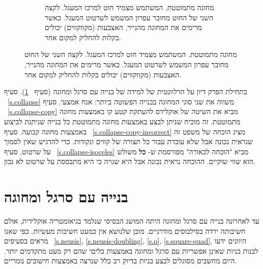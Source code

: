 \begin{figure}[htb]
\begin{center}
\begin{subfigure}[b]{.4\textwidth}
\caption{%
מחוגה מתמוטטת. המשתמש מצמיד חוט למרכז המעגל. לקצה השני של החוט מחובר עפרון המשמש לשרטוט המעגל. כאשר מרימים את המחוגה מהנייר, האצבעות (מקווקווים) יכולים בקלות להחליק למקום אחר.%
}\label{fig.collapsing-compass}
\end{subfigure}
\end{center}
\end{figure}

בתחילת הפרק דיון על הרלוונטית של למידה של בנייה עם סרגל ומחוגה (סעיף%
~\ref{s.relevance}).
סעיף%
~\ref{s.collapse} 
משווה את שני סוגי המחוגה בבנייה הפשוטה ביותר: אנח אמצעי. סעיף%
~\ref{s.collapse-copy}
מביא את השיטה של אוקלידס להעתקת קטע קו באמצעות מחוגה מתמוטטת. זה מוכיח שניתן לבצע באמצעות מחוגה מתמוטטת כל בנייה שניתנת לביצוע באמצעות מחוגה קבועה. סעיף%
~\ref{s.collapse-copy-incorrect} 
מציג הוכחה של משפט זה שנראית נכונה אבל שלא עובדת עבור כל תצורה של קווים ונקודות. כדי להדגיש שאין לסמוך על שרטוט, סעיף%
~\ref{s.collapse-isoceles}
מביא "הוכחה לכאורה" מפורסמת ש-
\textbf{כל}
משולש הוא שווי שוקיים. ההוכחה נראית נכונה אבל היא שגויה כי היא מתבססת על שרטוט לא נכון.


\section{בנייה עם סרגל ומחוגה}\label{s.relevance}

עד לאחרונה בנייה עם סרגל ומחוגה היתה המושג הבסיסי שנלמד בגיאומטריה אוקלידית, אולם חשיבותה ירדה בסילבוסים מודרניים. מובן שלנושא אין כמעט חשיבות מעשיות. כפי שאנו מראים בסעיפים%
~\ref{s.neusis}, \ref{s.neusis-doubling}, \ref{s.q}, \ref{s.square-quad},
היוונים ידעו לבנות בניות שאינן אפשריות עם סרגל ומחוגה באמצעות כליםי שהם רק מעט מתקדמים יותר. היום מחשבים מסוגלים לבצע בניות בדיוק רב כלל שנרצה באמצעות חישובים נומריים.

